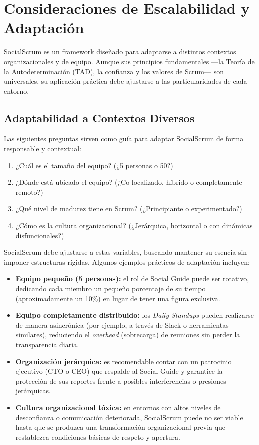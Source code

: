 \section{Consideraciones de Escalabilidad y Adaptación}

SocialScrum es un framework diseñado para adaptarse a distintos contextos organizacionales y de equipo.
Aunque sus principios fundamentales —la Teoría de la Autodeterminación (TAD), la confianza y los valores de Scrum— son universales, su aplicación práctica debe ajustarse a las particularidades de cada entorno.

\subsection{Adaptabilidad a Contextos Diversos}

Las siguientes preguntas sirven como guía para adaptar SocialScrum de forma responsable y contextual:

\begin{enumerate}
    \item ¿Cuál es el tamaño del equipo? (¿5 personas o 50?)
    \item ¿Dónde está ubicado el equipo? (¿Co-localizado, híbrido o completamente remoto?)
    \item ¿Qué nivel de madurez tiene en Scrum? (¿Principiante o experimentado?)
    \item ¿Cómo es la cultura organizacional? (¿Jerárquica, horizontal o con dinámicas disfuncionales?)
\end{enumerate}

SocialScrum debe ajustarse a estas variables, buscando mantener su esencia sin imponer estructuras rígidas. Algunos ejemplos prácticos de adaptación incluyen:

\begin{itemize}
    \item \textbf{Equipo pequeño (5 personas):} el rol de Social Guide puede ser rotativo, dedicando cada miembro un pequeño porcentaje de su tiempo (aproximadamente un 10\%) en lugar de tener una figura exclusiva.
    \item \textbf{Equipo completamente distribuido:} los \textit{Daily Standups} pueden realizarse de manera asincrónica (por ejemplo, a través de Slack o herramientas similares), reduciendo el \textit{overhead} (sobrecarga) de reuniones sin perder la transparencia diaria.
    \item \textbf{Organización jerárquica:} es recomendable contar con un patrocinio ejecutivo (CTO o CEO) que respalde al Social Guide y garantice la protección de sus reportes frente a posibles interferencias o presiones jerárquicas.
    \item \textbf{Cultura organizacional tóxica:} en entornos con altos niveles de desconfianza o comunicación deteriorada, SocialScrum puede no ser viable hasta que se produzca una transformación organizacional previa que restablezca condiciones básicas de respeto y apertura.
\end{itemize}

